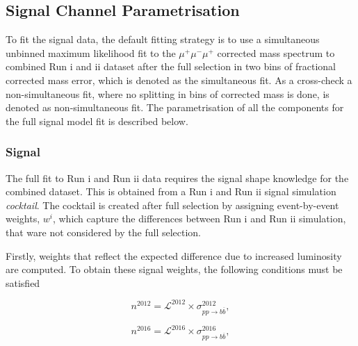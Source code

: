 \subsection{Signal Channel Parametrisation}
\label{sigpara}
To fit the signal data, the default fitting strategy is to use a simultaneous unbinned maximum likelihood fit to the $\mu^{+} \mu^{-} \mu^{+}$ corrected mass spectrum to combined Run \Rn{1} and \Rn{2} dataset after the full selection in two bins of fractional corrected mass error, which is denoted as the simultaneous fit. As a cross-check a non-simultaneous fit, where no splitting in bins of corrected mass is done, is denoted as non-simultaneous fit. The parametrisation of all the components for the full signal model fit is described below.


\subsubsection{Signal}
The full fit to Run \Rn{1} and Run \Rn{2} data requires the signal shape knowledge for the combined dataset. This is obtained from a Run \Rn{1} and Run \Rn{2} signal simulation \textit{cocktail}. The cocktail is created after full selection by assigning event-by-event weights, \textit{$w^{i}$}, which capture the differences between Run \Rn{1} and Run \Rn{2} simulation, that ware not considered by the full selection.

Firstly, weights that reflect the expected difference due to increased luminosity are computed. To obtain these signal weights, the following conditions must be satisfied

\begin{equation}
n^{2012}=\mathcal{L}^{2012} \times \sigma^{2012}_{pp \rightarrow b \overline{b}},
\end{equation}

\begin{equation}
n^{2016}=\mathcal{L}^{2016} \times \sigma^{2016}_{pp \rightarrow b \overline{b}},
\end{equation}

